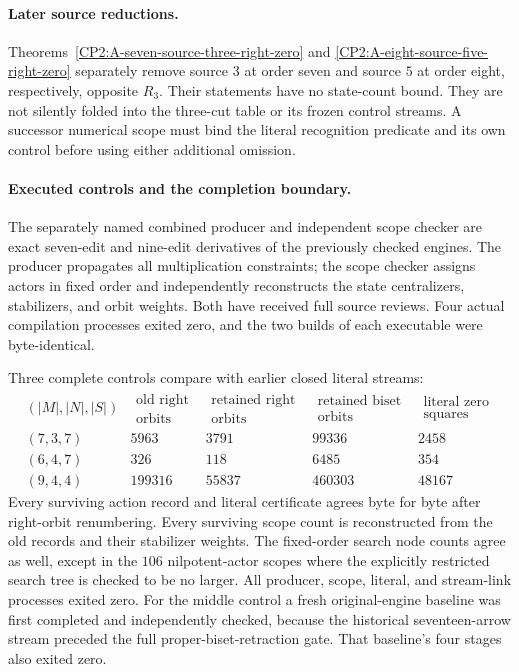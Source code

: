 \paragraph{Later source reductions.}
Theorems~\ref{CP2:A-seven-source-three-right-zero} and
\ref{CP2:A-eight-source-five-right-zero} separately remove source $3$
at order seven and source $5$ at order eight, respectively, opposite $R_3$.
Their statements have no state-count bound. They are not silently folded into
the three-cut table or its frozen control streams. A successor numerical
scope must bind the literal recognition predicate and its own control before
using either additional omission.

\paragraph{Executed controls and the completion boundary.}
The separately named combined producer and independent scope checker are
exact seven-edit and nine-edit derivatives of the previously checked engines.
The producer propagates all multiplication constraints; the scope checker
assigns actors in fixed order and independently reconstructs the state
centralizers, stabilizers, and orbit weights.  Both have received full source
reviews.  Four actual compilation processes exited zero, and the two builds
of each executable were byte-identical.

Three complete controls compare with earlier closed literal streams:
\[
\begin{array}{c|r|r|r|r}
(|M|,|N|,|S|)&\substack{\text{old right}\\\text{orbits}}&\substack{\text{retained right}\\\text{orbits}}&
 \substack{\text{retained biset}\\\text{orbits}}&\substack{\text{literal zero}\\\text{squares}}\\\hline
(7,3,7)&5963&3791&99336&2458\\
(6,4,7)&326&118&6485&354\\
(9,4,4)&199316&55837&460303&48167
\end{array}
\]
Every surviving action record and literal certificate agrees byte for byte
after right-orbit renumbering.  Every surviving scope count is reconstructed
from the old records and their stabilizer weights.  The fixed-order search
node counts agree as well, except in the $106$ nilpotent-actor scopes where
the explicitly restricted search tree is checked to be no larger.  All
producer, scope, literal, and stream-link processes exited zero.  For the
middle control a fresh original-engine baseline was first completed and
independently checked, because the historical seventeen-arrow stream preceded
the full proper-biset-retraction gate.  That baseline's four stages also
exited zero.

